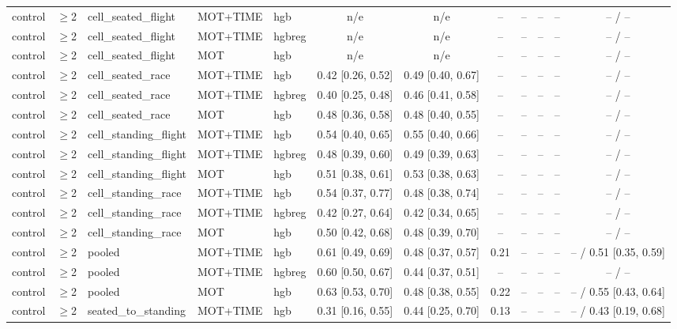 \begin{longtable}{@{}lllllcccrrrc@{}}
control & $\geq$2 & cell\_seated\_flight & MOT+TIME & hgb & n/e & n/e & -- & -- & -- & -- & -- / -- \\
control & $\geq$2 & cell\_seated\_flight & MOT+TIME & hgbreg & n/e & n/e & -- & -- & -- & -- & -- / -- \\
control & $\geq$2 & cell\_seated\_flight & MOT & hgb & n/e & n/e & -- & -- & -- & -- & -- / -- \\
control & $\geq$2 & cell\_seated\_race & MOT+TIME & hgb & 0.42 [0.26, 0.52] & 0.49 [0.40, 0.67] & -- & -- & -- & -- & -- / -- \\
control & $\geq$2 & cell\_seated\_race & MOT+TIME & hgbreg & 0.40 [0.25, 0.48] & 0.46 [0.41, 0.58] & -- & -- & -- & -- & -- / -- \\
control & $\geq$2 & cell\_seated\_race & MOT & hgb & 0.48 [0.36, 0.58] & 0.48 [0.40, 0.55] & -- & -- & -- & -- & -- / -- \\
control & $\geq$2 & cell\_standing\_flight & MOT+TIME & hgb & 0.54 [0.40, 0.65] & 0.55 [0.40, 0.66] & -- & -- & -- & -- & -- / -- \\
control & $\geq$2 & cell\_standing\_flight & MOT+TIME & hgbreg & 0.48 [0.39, 0.60] & 0.49 [0.39, 0.63] & -- & -- & -- & -- & -- / -- \\
control & $\geq$2 & cell\_standing\_flight & MOT & hgb & 0.51 [0.38, 0.61] & 0.53 [0.38, 0.63] & -- & -- & -- & -- & -- / -- \\
control & $\geq$2 & cell\_standing\_race & MOT+TIME & hgb & 0.54 [0.37, 0.77] & 0.48 [0.38, 0.74] & -- & -- & -- & -- & -- / -- \\
control & $\geq$2 & cell\_standing\_race & MOT+TIME & hgbreg & 0.42 [0.27, 0.64] & 0.42 [0.34, 0.65] & -- & -- & -- & -- & -- / -- \\
control & $\geq$2 & cell\_standing\_race & MOT & hgb & 0.50 [0.42, 0.68] & 0.48 [0.39, 0.70] & -- & -- & -- & -- & -- / -- \\
control & $\geq$2 & pooled & MOT+TIME & hgb & 0.61 [0.49, 0.69] & 0.48 [0.37, 0.57] & 0.21 & -- & -- & -- & -- / 0.51 [0.35, 0.59] \\
control & $\geq$2 & pooled & MOT+TIME & hgbreg & 0.60 [0.50, 0.67] & 0.44 [0.37, 0.51] & -- & -- & -- & -- & -- / -- \\
control & $\geq$2 & pooled & MOT & hgb & 0.63 [0.53, 0.70] & 0.48 [0.38, 0.55] & 0.22 & -- & -- & -- & -- / 0.55 [0.43, 0.64] \\
control & $\geq$2 & seated\_to\_standing & MOT+TIME & hgb & 0.31 [0.16, 0.55] & 0.44 [0.25, 0.70] & 0.13 & -- & -- & -- & -- / 0.43 [0.19, 0.68] \\

\end{longtable}
